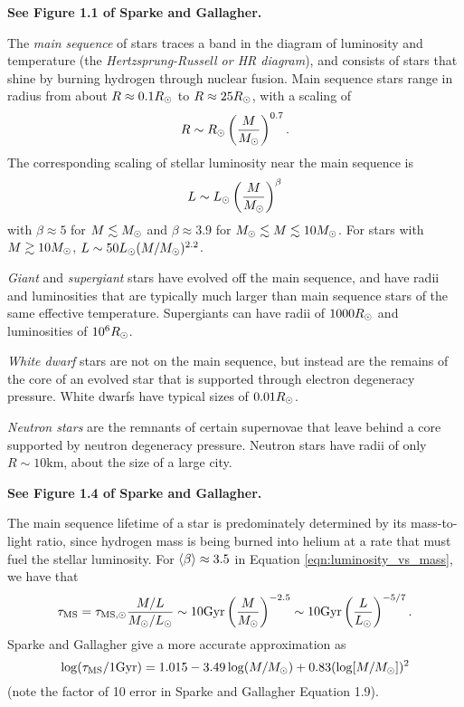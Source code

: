 \documentclass[12pt]{article}
\begin{document}
{\bf See Figure 1.1 of Sparke and Gallagher.}

The {\it main sequence} of stars traces a band in the diagram of luminosity and
temperature (the {\it Hertzsprung-Russell or HR diagram}), and consists of stars that
shine by burning hydrogen through nuclear fusion. Main sequence stars range in
radius from about $R\approx0.1R_{\odot}$ to $R\approx25R_{\odot}$, with a scaling of
\begin{equation}
R\sim R_{\odot}\left(\frac{M}{M_{\odot}}\right)^{0.7}.
\end{equation}
\noindent
The corresponding scaling of stellar luminosity near the main sequence is
\begin{equation}
\label{eqn:luminosity_vs_mass}
L\sim L_{\odot}\left(\frac{M}{M_{\odot}}\right)^{\beta}
\end{equation}
\noindent
with $\beta\approx5$ for $M\lesssim M_{\odot}$ and 
$\beta\approx3.9$ for $M_{\odot}\lesssim M \lesssim 10M_{\odot}$. For stars
with $M\gtrsim10M_{\odot}$, $L\sim50L_{\odot}(M/M_{\odot})^{2.2}$.

{\it Giant} and {\it supergiant} stars have evolved off the main sequence, and
have radii and luminosities that are typically much larger than main sequence
stars of the same effective temperature. Supergiants can have radii of $1000R_{\odot}$
and luminosities of $10^{6}R_{\odot}$.

{\it White dwarf} stars are not on the main sequence, but instead are the
remains of the core of an evolved star that is supported through electron
degeneracy pressure. White dwarfs have typical sizes of $0.01R_{\odot}$.

{\it Neutron stars} are the remnants of certain supernovae that leave behind
a core supported by neutron degeneracy pressure. Neutron stars have radii 
of only $R\sim10\mathrm{km}$, about the size of a large city.

{\bf See Figure 1.4 of Sparke and Gallagher.}

The main sequence lifetime of a star is predominately determined by its
mass-to-light ratio, since hydrogen mass is being burned into helium at a 
rate that must fuel the stellar luminosity. For $\langle\beta\rangle \approx 3.5$ in
Equation \ref{eqn:luminosity_vs_mass}, we have that
\begin{equation}
\label{eqn:main_sequence_lifetime_basic}
\tau_{\mathrm{MS}} = \tau_{\mathrm{MS},\odot}\frac{M/L}{M_{\odot}/L_{\odot}} \sim 10\mathrm{Gyr}\left(\frac{M}{M_{\odot}}\right)^{-2.5}\sim 10\mathrm{Gyr}\left(\frac{L}{L_{\odot}}\right)^{-5/7}.
\end{equation}
Sparke and Gallagher give a more accurate approximation as
\begin{equation}
\label{eqn:main_sequence_lifetime}
\log(\tau_{\mathrm{MS}}/1\mathrm{Gyr}) = 1.015 - 3.49\log(M/M_{\odot}) +0.83(\log[M/M_{\odot}])^2
\end{equation}
\noindent
(note the factor of 10 error in Sparke and Gallagher Equation 1.9).
\end{document}
